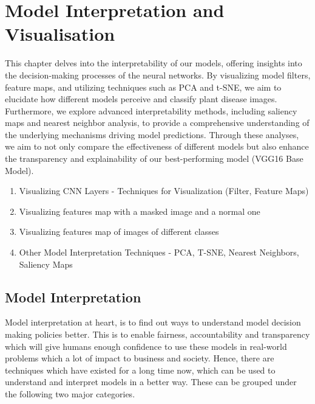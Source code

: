 \chapter{Model Interpretation and Visualisation}
\label{chap:Model Interpretation and Visualisation}

This chapter delves into the interpretability of our models, offering insights into the decision-making processes of the neural networks. By visualizing model filters, feature maps, and utilizing techniques such as PCA and t-SNE, we aim to elucidate how different models perceive and classify plant disease images. Furthermore, we explore advanced interpretability methods, including saliency maps and nearest neighbor analysis, to provide a comprehensive understanding of the underlying mechanisms driving model predictions. Through these analyses, we aim to not only compare the effectiveness of different models but also enhance the transparency and explainability of our best-performing model (VGG16 Base Model).
\par\vspace{1em}

\begin{enumerate}
  \item Visualizing CNN Layers - Techniques for Visualization (Filter, Feature Maps)
  \item Visualizing features map with a masked image and a normal one
  \item Visualizing features map of images of different classes
  \item Other Model Interpretation Techniques - PCA, T-SNE, Nearest Neighbors, Saliency Maps
\end{enumerate}

\par\vspace{1em}

\section{Model Interpretation}

Model interpretation at heart, is to find out ways to understand model decision making policies better. This is to enable fairness, accountability and transparency which will give humans enough confidence to use these models in real-world problems which a lot of impact to business and society. Hence, there are techniques which have existed for a long time now, which can be used to understand and interpret models in a better way. These can be grouped under the following two major categories.

